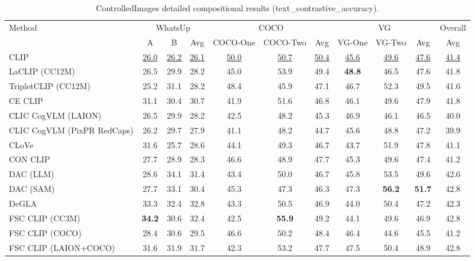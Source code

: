 \begin{table}[t]
  \centering
  \scriptsize
  \caption{ControlledImages detailed compositional results (text_contrastive_accuracy).}
  \label{tab:ControlledImages_detailed}
  \begin{adjustbox}{max width=\textwidth}
  \setlength{\tabcolsep}{2pt}
  \begin{tabular}{p{5cm}ccc|ccc|ccc|c}
    \toprule
    Method & \multicolumn{3}{c}{WhatsUp} & \multicolumn{3}{c}{COCO} & \multicolumn{3}{c}{VG} & Overall \\
     & A & B & Avg & COCO-One & COCO-Two & Avg & VG-One & VG-Two & Avg & Avg \\
    \midrule
    CLIP & \underline{26.0} & \underline{26.2} & \underline{26.1} & \underline{50.0} & \underline{50.7} & \underline{50.4} & \underline{45.6} & \underline{49.6} & \underline{47.6} & \underline{41.4} \\
    \midrule
    LaCLIP (CC12M) & 26.5 & 29.9 & 28.2 & 45.0 & 53.9 & 49.4 & \textbf{48.8} & 46.5 & 47.6 & 41.8 \\
    TripletCLIP (CC12M) & 25.2 & 31.1 & 28.2 & 48.4 & 45.9 & 47.1 & 46.7 & 52.3 & 49.5 & 41.6 \\
    \midrule
    CE CLIP & 31.1 & 30.4 & 30.7 & 41.9 & 51.6 & 46.8 & 46.1 & 49.6 & 47.9 & 41.8 \\
    CLIC CogVLM (LAION) & 26.5 & 29.9 & 28.2 & 42.5 & 48.2 & 45.3 & 46.9 & 46.1 & 46.5 & 40.0 \\
    CLIC CogVLM (PixPR RedCaps) & 26.2 & 29.7 & 27.9 & 41.1 & 48.2 & 44.7 & 45.6 & 48.8 & 47.2 & 39.9 \\
    CLoVe & 31.6 & 25.7 & 28.6 & 44.1 & 49.3 & 46.7 & 43.7 & 51.9 & 47.8 & 41.1 \\
    CON CLIP & 27.7 & 28.9 & 28.3 & 46.6 & 48.9 & 47.7 & 45.3 & 49.6 & 47.4 & 41.2 \\
    DAC (LLM) & 28.6 & 34.1 & 31.4 & 43.4 & 50.0 & 46.7 & 45.8 & 53.5 & 49.6 & 42.6 \\
    DAC (SAM) & 27.7 & 33.1 & 30.4 & 45.3 & 47.3 & 46.3 & 47.3 & \textbf{56.2} & \textbf{51.7} & 42.8 \\
    DeGLA & 33.3 & 32.4 & 32.8 & 43.3 & 50.5 & 46.9 & 44.0 & 50.4 & 47.2 & 42.3 \\
    FSC CLIP (CC3M) & \textbf{34.2} & 30.6 & 32.4 & 42.5 & \textbf{55.9} & 49.2 & 44.1 & 49.6 & 46.9 & 42.8 \\
    FSC CLIP (COCO) & 28.4 & 30.6 & 29.5 & 46.6 & 50.2 & 48.4 & 46.4 & 44.6 & 45.5 & 41.2 \\
    FSC CLIP (LAION+COCO) & 31.6 & 31.9 & 31.7 & 42.3 & 53.2 & 47.7 & 47.5 & 50.4 & 48.9 & 42.8 \\

\end{tabular}
\end{adjustbox}
\end{table}
